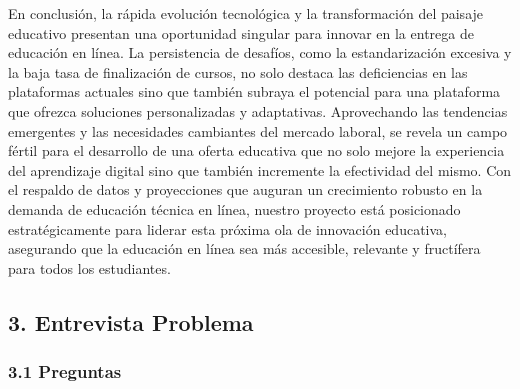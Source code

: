 \documentclass[
]{article}
\begin{document}
En conclusión, la rápida evolución tecnológica y la transformación del
paisaje educativo presentan una oportunidad singular para innovar en la
entrega de educación en línea. La persistencia de desafíos, como la
estandarización excesiva y la baja tasa de finalización de cursos, no
solo destaca las deficiencias en las plataformas actuales sino que
también subraya el potencial para una plataforma que ofrezca soluciones
personalizadas y adaptativas. Aprovechando las tendencias emergentes y
las necesidades cambiantes del mercado laboral, se revela un campo
fértil para el desarrollo de una oferta educativa que no solo mejore la
experiencia del aprendizaje digital sino que también incremente la
efectividad del mismo. Con el respaldo de datos y proyecciones que
auguran un crecimiento robusto en la demanda de educación técnica en
línea, nuestro proyecto está posicionado estratégicamente para liderar
esta próxima ola de innovación educativa, asegurando que la educación en
línea sea más accesible, relevante y fructífera para todos los
estudiantes.

\newpage

\subsection{3. Entrevista Problema}\label{entrevista-problema}

\subsubsection{3.1 Preguntas}\label{preguntas}
\end{document}
